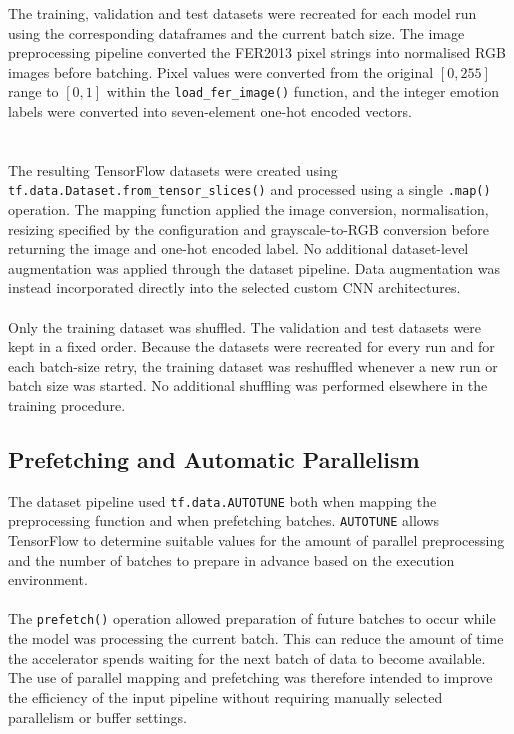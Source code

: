 \documentclass[12pt, a4paper]{report}
\let\oldsubsection\subsection
\renewcommand{\subsection}{%
    \Needspace{6\baselineskip}%
    \oldsubsection
}
\begin{document}
				The training, validation and test datasets were recreated for each model run using the corresponding dataframes and the current batch size. The image preprocessing pipeline converted the FER2013 pixel strings into normalised RGB images before batching. Pixel values were converted from the original $[0,255]$ range to $[0,1]$ within the \texttt{load\_fer\_image()} function, and the integer emotion labels were converted into seven-element one-hot encoded vectors.\\\\\\
				The resulting TensorFlow datasets were created using\\ \texttt{tf.data.Dataset.from\_tensor\_slices()} and processed using a single \texttt{.map()} operation. The mapping function applied the image conversion, normalisation, resizing specified by the configuration and grayscale-to-RGB conversion before returning the image and one-hot encoded label. No additional dataset-level augmentation was applied through the dataset pipeline. Data augmentation was instead incorporated directly into the selected custom CNN architectures.\\\\
				Only the training dataset was shuffled. The validation and test datasets were kept in a fixed order. Because the datasets were recreated for every run and for each batch-size retry, the training dataset was reshuffled whenever a new run or batch size was started. No additional shuffling was performed elsewhere in the training procedure.
				
			\subsection{Prefetching and Automatic Parallelism}
				
				The dataset pipeline used \texttt{tf.data.AUTOTUNE} both when mapping the preprocessing function and when prefetching batches. \texttt{AUTOTUNE} allows TensorFlow to determine suitable values for the amount of parallel preprocessing and the number of batches to prepare in advance based on the execution environment.\\\\
				The \texttt{prefetch()} operation allowed preparation of future batches to occur while the model was processing the current batch. This can reduce the amount of time the accelerator spends waiting for the next batch of data to become available. The use of parallel mapping and prefetching was therefore intended to improve the efficiency of the input pipeline without requiring manually selected parallelism or buffer settings.
				
\end{document}
